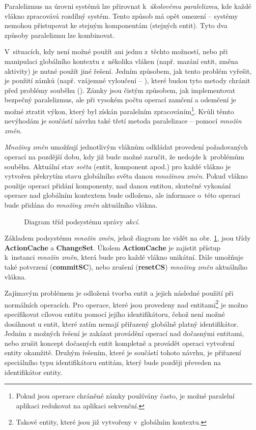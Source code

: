 Paralelizmus na úrovni systémů lze přirovnat k~\emph{úkolovému paralelizmu}, kde každé vlákno zpracovává rozdílný systém. Tento způsob má opět omezení -- systémy nemohou přistupovat ke stejným komponentám (stejných entit). Tyto dva způsoby paralelizmu lze kombinovat.

V~situacích, kdy není možné použít ani jednu z~těchto možností, nebo při manipulaci globálního kontextu z~několika vláken (např. mazání entit, změna aktivity) je nutné použít jiné řešení. Jedním způsobem, jak tento problém vyřešit, je použití zámků (např. vzájemné vyloučení -- ), které budou tyto metody chránit před problémy souběhu (). Zámky jsou čistým způsobem, jak implementovat bezpečný paralelizmus, ale při vysokém počtu operací zamčení a odemčení je možné ztratit výkon, který byl získán paralelním zpracováním\footnote{Pokud jsou operace chráněné zámky používány často, je možné paralelní aplikaci redukovat na aplikaci sekvenční.}. Kvůli těmto nevýhodám je součástí návrhu také třetí metoda paralelizace -- pomocí \emph{množin změn}.

\emph{Množiny změn} umožňují jednotlivým vláknům odkládat provedení požadovaných operací na pozdější dobu, kdy již bude možné zaručit, že nedojde k~problémům souběhu. Aktuální stav \emph{světa} (entit, komponent apod.) pro každé vlákno je vytvořen překrytím stavu globálního světa danou \emph{množinou změn}. Pokud vlákno použije operaci přidání komponenty, nad danou entitou, skutečné vykonání operace nad globálním kontextem bude odloženo, ale informace o~této operaci bude přidána do \emph{množiny změn} aktuálního vlákna.

\begin{figure}[H]
	\centering
	\caption{Diagram tříd podsystému správy \emph{akcí}.}
	\label{Fig:DESActionDiag}
\end{figure}

Základem podsystému \emph{množin změn}, jehož diagram lze vidět na obr. \ref{Fig:DESActionDiag}, jsou třídy \textbf{ActionCache} a \textbf{ChangeSet}. Úkolem \textbf{ActionCache} je zajistit přístup k~instanci \emph{množin změn}, která bude pro každé vlákno unikátní. Dále umožňuje také potvrzení (\textbf{commitSC}), nebo zrušení (\textbf{resetCS}) \emph{množiny změn} aktuálního vlákna. 

Zajímavým problémem je odložená tvorba entit a jejich následné použití při normálních operacích. Pro operace, které jsou provedeny nad  entitami\footnote{Takové entity, které jsou již vytvořeny v~globálním kontextu.} je možno specifikovat cílovou entitu pomocí jejího identifikátoru, čehož není možné dosáhnout u  entit, které zatím nemají přiřazený globálně platný identifikátor. Jedním z možných řešení je zakázat provádění operací nad dočasnými entitami, nebo zrušit koncept dočasných entit kompletně a provádět operaci vytvoření entity okamžitě. Druhým řešením, které je součástí tohoto návrhu, je přiřazení speciálního typu identifikátoru  entitám, který bude později převeden na identifikátor  entity.

